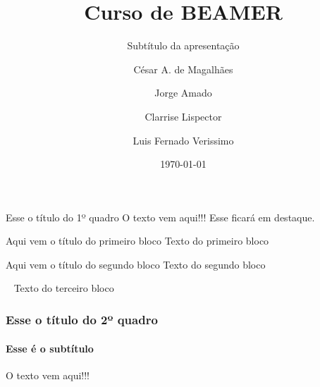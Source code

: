 \documentclass[aspectratio=169]{beamer}
\title{Curso de BEAMER}
\subtitle{Subtítulo da apresentação}
\author[César \and Jorge \and Clarrise \and Luis]{César A. de Magalhães \and Jorge Amado \and Clarrise Lispector \and Luis Fernado Verissimo}
\institute[UNOPAR]{Universidade do Norte do Paraná \\ https://vestibular.unoparead.com.br}
\date{\today}
\begin{document}
	\begin{frame}
		\titlepage
	\end{frame}
	\begin{frame}{Esse o título do 1º quadro}
		O texto vem aqui!!!
		\alert{Esse ficará em destaque.} \pause
		\begin{block}{Aqui vem o título do primeiro bloco}
			Texto do primeiro bloco
		\end{block}\pause	
		\begin{block}{Aqui vem o título do segundo bloco}
			Texto do segundo bloco
		\end{block}\pause
		\begin{block}{\ }
			Texto do terceiro bloco
		\end{block}
	\end{frame}
	\begin{frame}
		\frametitle{Esse o título do 2º quadro}
		\framesubtitle{Esse é o subtítulo}
		O texto vem aqui!!!
	\end{frame}
\end{document}
